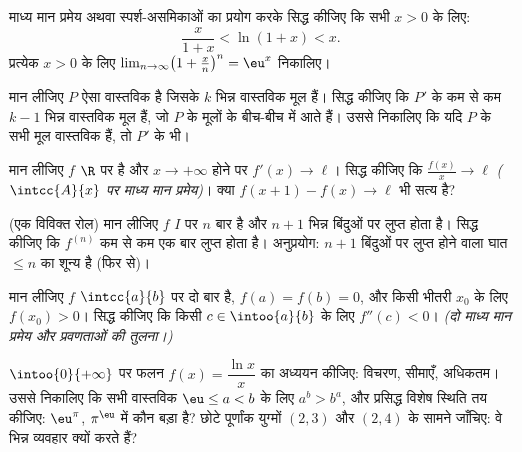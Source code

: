 \begin{exercise}[$\star$]\label{exo:b1:derivative:3}
माध्य मान प्रमेय अथवा स्पर्श-असमिकाओं का प्रयोग करके सिद्ध कीजिए कि सभी $x >
0$ के लिए:
\[
\frac{x}{1 + x} < \ln(1 + x) < x .
\]
प्रत्येक $x > 0$ के लिए $\lim_{n\to\infty} \bigl(1 + \frac xn\bigr)^n =
\eu^x$ निकालिए।
\end{exercise}

\begin{exercise}[$\star$]\label{exo:b1:derivative:4}
मान लीजिए $P$ ऐसा वास्तविक  है जिसके $k$ भिन्न वास्तविक मूल हैं। सिद्ध
कीजिए कि $P'$ के कम से कम $k - 1$ भिन्न वास्तविक मूल हैं, जो $P$ के मूलों के
बीच-बीच में आते हैं। उससे निकालिए कि यदि $P$ के सभी मूल वास्तविक हैं, तो
$P'$ के भी।
\end{exercise}

\begin{exercise}[$\star\star$]\label{exo:b1:derivative:5}
मान लीजिए $f$ $\R$ पर  है और $x \to +\infty$ होने पर $f' (x)\to
\ell$। सिद्ध कीजिए कि $\frac{f(x)}{x} \to \ell$ \emph{($\intcc{A}{x}$ पर
माध्य मान प्रमेय)}। क्या $f(x+1) - f(x) \to \ell$ भी सत्य है?
\end{exercise}

\begin{exercise}[$\star\star$]\label{exo:b1:derivative:6}
(एक विविक्त रोल) मान लीजिए $f$ $I$ पर $n$ बार  है और $n + 1$ भिन्न
बिंदुओं पर लुप्त होता है। सिद्ध कीजिए कि $f^{(n)}$ कम से कम एक बार लुप्त
होता है। अनुप्रयोग: $n+1$ बिंदुओं पर लुप्त होने वाला घात $\leq n$ का 
शून्य है (फिर से)।
\end{exercise}

\begin{exercise}[$\star\star$]\label{exo:b1:derivative:7}
मान लीजिए $f$ $\intcc{a}{b}$ पर दो बार  है, $f(a) = f(b) = 0$, और
किसी भीतरी $x_0$ के लिए $f(x_0) > 0$। सिद्ध कीजिए कि किसी $c \in
\intoo{a}{b}$ के लिए $f''(c) < 0$। \emph{(दो माध्य मान प्रमेय और प्रवणताओं
की तुलना।)}
\end{exercise}

\begin{exercise}[$\star\star$]\label{exo:b1:derivative:8}
$\intoo{0}{+\infty}$ पर फलन $f(x) = \dfrac{\ln x}{x}$ का अध्ययन कीजिए:
विचरण, सीमाएँ, अधिकतम। उससे निकालिए कि सभी वास्तविक $\eu \leq a < b$ के लिए
$a^b > b^a$, और प्रसिद्ध विशेष स्थिति तय कीजिए: $\eu^\pi$, $\pi^\eu$ में कौन
बड़ा है? छोटे पूर्णांक युग्मों $(2,3)$ और $(2,4)$ के सामने जाँचिए: वे भिन्न
व्यवहार क्यों करते हैं?
\end{exercise}

